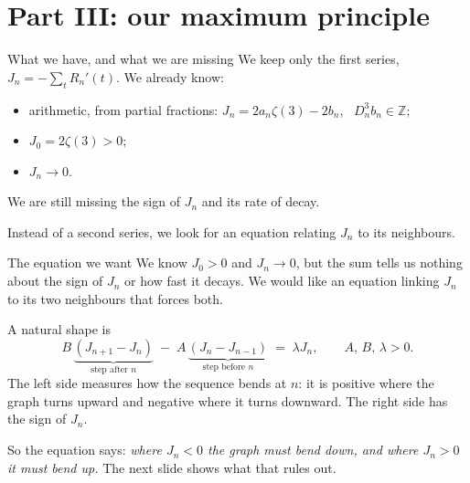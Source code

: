 \documentclass[aspectratio=169,11pt]{beamer}
\newcommand{\Z}{\mathbb{Z}}
\newcommand{\Dn}{D_n}
\begin{document}
\section{Part III: our maximum principle}

\begin{frame}{What we have, and what we are missing}
  We keep only the first series, $J_n=-\sum_tR_n'(t)$. We already know:
  \begin{itemize}
    \item arithmetic, from partial fractions: $J_n=2a_n\zeta(3)-2b_n$, \ $\Dn^3b_n\in\Z$;
    \item $J_0=2\zeta(3)>0$;
    \item $J_n\to0$.
  \end{itemize}
  \pause
  \medskip
  We are still missing the \alert{sign} of $J_n$ and its \alert{rate of decay}.
  \pause
  \medskip

  Instead of a second series, we look for an equation relating $J_n$ to its neighbours.
\end{frame}

\begin{frame}{The equation we want}
  We know $J_0>0$ and $J_n\to0$, but the sum tells us nothing about the sign of $J_n$ or how fast
  it decays. We would like an equation linking $J_n$ to its two neighbours that forces both.
  \medskip

  A natural shape is
  \[
    B\,\underbrace{(J_{n+1}-J_n)}_{\text{step after }n}\;-\;A\,\underbrace{(J_n-J_{n-1})}_{\text{step before }n}\;=\;\lambda J_n,
    \qquad A,\,B,\,\lambda>0 .
  \]
  The left side measures how the sequence bends at $n$: it is positive where the graph turns
  upward and negative where it turns downward. The right side has the sign of $J_n$.
  \medskip

  So the equation says: \emph{where $J_n<0$ the graph must bend down, and where $J_n>0$ it must
  bend up.} The next slide shows what that rules out.
\end{frame}
\end{document}
